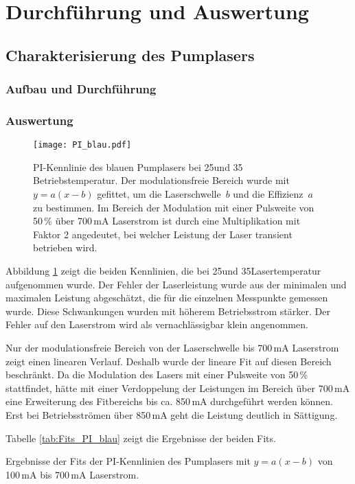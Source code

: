 \section{Durchführung und Auswertung}

\subsection{Charakterisierung des Pumplasers}


\subsubsection{Aufbau und Durchführung}

\subsubsection{Auswertung}

\begin{figure}[H]
\begin{center}
  \texttt{[image: PI\_blau.pdf]}
  \caption{PI-Kennlinie des blauen Pumplasers bei 25\grad und 35\grad
  Betriebstemperatur. Der modulationsfreie Bereich wurde mit $y=a(x-b)$
  gefittet, um die Laserschwelle~$b$ und die Effizienz~$a$ zu bestimmen. Im
  Bereich der Modulation mit einer Pulsweite von 50\,\% über 700\,mA Laserstrom ist durch eine
  Multiplikation mit Faktor 2 angedeutet, bei welcher Leistung der Laser
  transient betrieben wird.}
  \label{img:PI_blau}
\end{center}
\end{figure}

Abbildung \ref{img:PI_blau} zeigt die beiden Kennlinien, die bei 25\grad und 35\grad Lasertemperatur
aufgenommen wurde.
Der Fehler der Laserleistung wurde aus der minimalen und maximalen Leistung abgeschätzt, die für die
einzelnen Messpunkte gemessen wurde.
Diese Schwankungen wurden mit höherem Betriebsstrom stärker.
Der Fehler auf den Laserstrom wird als vernachlässigbar klein angenommen.

 Nur der modulationsfreie Bereich von der Laserschwelle bis 700\,mA Laserstrom
zeigt einen linearen Verlauf.
Deshalb wurde der lineare Fit auf diesen Bereich beschränkt.
Da die Modulation des Lasers mit einer Pulsweite von 50\,\% stattfindet, hätte mit einer
Verdoppelung der Leistungen im Bereich über 700\,mA eine Erweiterung des Fitbereichs bis ca. 850\,mA
durchgeführt werden können. Erst bei Betriebsströmen über 850\,mA geht die Leistung deutlich in
Sättigung.

Tabelle \ref{tab:Fits_PI_blau} zeigt die Ergebnisse der beiden Fits.


\begin{table}[htb]
\caption{Ergebnisse der Fits der PI-Kennlinien des Pumplasers mit $y=a(x-b)$ von 100\,mA bis
700\,mA Laserstrom.}

\label{tab:Fits_PI_blau}
\end{table}

\FloatBarrier
 